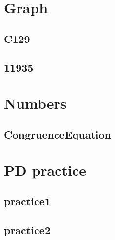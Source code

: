 

\section{Graph}
    \subsection{C129}
        
    \subsection{11935}
        

\section{Numbers}
    \subsection{CongruenceEquation}
        

\section{PD practice}
    \subsection{practice1}
        
    \subsection{practice2}
        
        